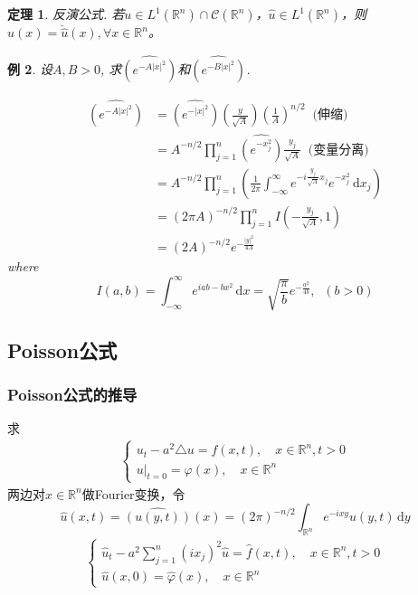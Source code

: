 \documentclass[11pt, a4paper]{article}
\theoremstyle{theorem}
\newtheorem{thm}{定理}[section]
\newtheorem{eg}[thm]{例}
\newcommand{\intd}[1]{\,\mathrm{d}{#1}}
\begin{document}
\begin{thm} 反演公式.
若$u \in L^1(\mathbb{R}^n) \cap \mathcal{C}(\mathbb{R}^n)$，$\hat{u} \in L^1(\mathbb{R}^n)$，则$u(x) = \breve{\hat{u}}(x), \forall x \in \mathbb{R}^n$。
\end{thm}

\begin{eg}
设$A,B > 0$, 求$\widehat{\left(e^{-A|x|^2}\right)}$和$\widehat{\left(e^{-B|x|^2}\right)}$.

\begin{align*}
    \widehat{\left(e^{-A|x|^2}\right)}
    &= \widehat{\left(e^{-|x|^2}\right)} \left(\frac{y}{\sqrt{A}}\right) \left(\frac{1}{A}\right)^{n/2} \; \; \text{(伸缩)} \\
    &= A^{-n/2} \prod_{j=1}^n \widehat{\left(e^{-x_j^2}\right)} \frac{y_j}{\sqrt{A}} \;\; \text{(变量分离)} \\
    &= A^{-n/2} \prod_{j=1}^n \left(\frac{1}{2\pi} \int_{-\infty}^\infty e^{-i\frac{y_j}{\sqrt{A}}x_j} e^{-x_j^2} \intd x_j \right) \\
    &= (2 \pi A)^{-n/2} \prod_{j=1}^n I\left(-\frac{y_j}{\sqrt{A}},1\right) \\
    &= (2A)^{-n/2} e^{-\frac{|y|^2}{4A}}
\end{align*}
where
$$
I(a,b) = \int_{-\infty}^\infty e^{iab - bx^2} \intd x = \sqrt{\frac{\pi}{b}} e^{-\frac{a^2}{4b}}, \; \; (b > 0)
$$
\end{eg}

\subsection{Poisson公式}

\subsubsection{Poisson公式的推导}

求
\begin{align}
\label{Q4-2-1}
    \begin{cases}
        u_t - a^2 \triangle u = f(x,t), \quad x \in \mathbb{R}^n, t > 0 \\
        u|_{t = 0} = \varphi(x), \quad x \in \mathbb{R}^n
    \end{cases}
\end{align}
两边对$x \in \mathbb{R}^n$做Fourier变换，令
$$
\hat{u}(x,t) = \widehat{\left(u(y,t)\right)}(x) = (2\pi)^{-n/2} \int_{\mathbb{R}^n} e^{-ixy} u(y,t) \intd y
$$
\begin{align*}
    \begin{cases}
        \hat{u}_t - a^2 \sum_{j=1}^n (i x_j)^2 \hat{u} = \hat{f}(x,t), \quad x \in \mathbb{R}^n, t > 0 \\
        \hat{u}(x,0) = \hat{\varphi}(x), \quad x \in \mathbb{R}^n
    \end{cases}
\end{align*}
\end{document}
